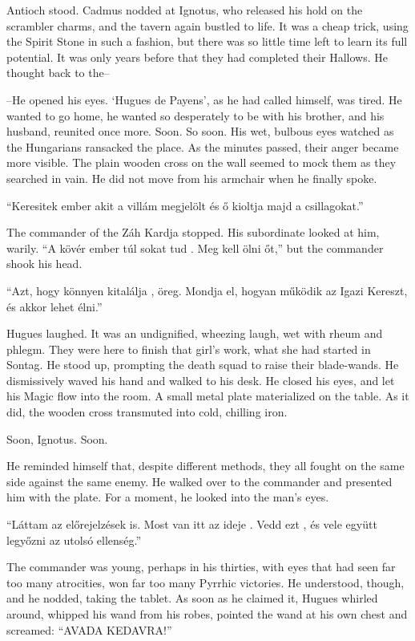 Antioch stood. Cadmus nodded at Ignotus, who released his hold on the scrambler charms, and the tavern again bustled to life. It was a cheap trick, using the Spirit Stone in such a fashion, but there was so little time left to learn its full potential. It was only years before that they had completed their Hallows. He thought back to the–

–He opened his eyes. ‘Hugues de Payens’, as he had called himself, was tired. He wanted to go home, he wanted so desperately to be with his brother, and his husband, reunited once more. Soon. So soon. His wet, bulbous eyes watched as the Hungarians ransacked the place. As the minutes passed, their anger became more visible. The plain wooden cross on the wall seemed to mock them as they searched in vain. He did not move from his armchair when he finally spoke.

“Keresitek ember akit a villám megjelölt és ő kioltja majd a csillagokat.”

The commander of the Záh Kardja stopped. His subordinate looked at him, warily. “A kövér ember túl sokat tud . Meg kell ölni őt,” but the commander shook his head.

“Azt, hogy könnyen kitalálja , öreg. Mondja el, hogyan működik az Igazi Kereszt, és akkor lehet élni.”

Hugues laughed. It was an undignified, wheezing laugh, wet with rheum and phlegm. They were here to finish that girl’s work, what she had started in Sontag. He stood up, prompting the death squad to raise their blade-wands. He dismissively waved his hand and walked to his desk. He closed his eyes, and let his Magic flow into the room. A small metal plate materialized on the table. As it did, the wooden cross transmuted into cold, chilling iron.

Soon, Ignotus. Soon.

He reminded himself that, despite different methods, they all fought on the same side against the same enemy. He walked over to the commander and presented him with the plate. For a moment, he looked into the man’s eyes.

“Láttam az előrejelzések is. Most van itt az ideje . Vedd ezt , és vele együtt legyőzni az utolsó ellenség.”

The commander was young, perhaps in his thirties, with eyes that had seen far too many atrocities, won far too many Pyrrhic victories. He understood, though, and he nodded, taking the tablet. As soon as he claimed it, Hugues whirled around, whipped his wand from his robes, pointed the wand at his own chest and screamed: “AVADA KEDAVRA!”
\simpleline

